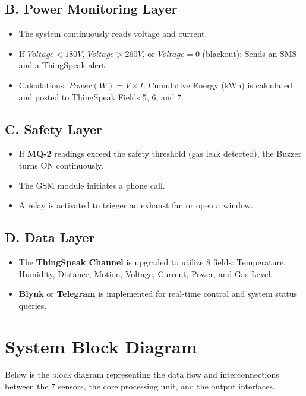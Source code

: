 \documentclass[12pt,a4paper]{article}
\begin{document}
\subsection{B. Power Monitoring Layer}
\begin{itemize}
    \item The system continuously reads voltage and current.
    \item If $Voltage < 180V$, $Voltage > 260V$, or $Voltage = 0$ (blackout): Sends an SMS and a ThingSpeak alert.
    \item Calculations: $Power (W) = V \times I$. Cumulative Energy (kWh) is calculated and posted to ThingSpeak Fields 5, 6, and 7.
\end{itemize}

\subsection{C. Safety Layer}
\begin{itemize}
    \item If \textbf{MQ-2} readings exceed the safety threshold (gas leak detected), the Buzzer turns ON continuously.
    \item The GSM module initiates a phone call.
    \item A relay is activated to trigger an exhaust fan or open a window.
\end{itemize}

\subsection{D. Data Layer}
\begin{itemize}
    \item The \textbf{ThingSpeak Channel} is upgraded to utilize 8 fields: Temperature, Humidity, Distance, Motion, Voltage, Current, Power, and Gas Level.
    \item \textbf{Blynk} or \textbf{Telegram} is implemented for real-time control and system status queries.
\end{itemize}

\section{System Block Diagram}
Below is the block diagram representing the data flow and interconnections between the 7 sensors, the core processing unit, and the output interfaces.
\end{document}
